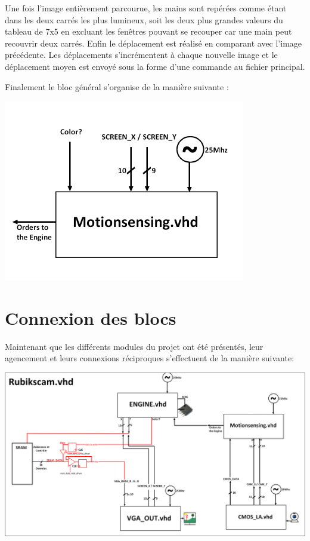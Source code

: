 \documentclass[10pt,a4paper]{report}
\begin{document}
Une fois l'image entièrement parcourue, les mains sont repérées comme étant dans les deux carrés les plus lumineux, soit les deux plus grandes valeurs du tableau de 7x5 en excluant les fenêtres pouvant se recouper car une main peut recouvrir deux carrés. Enfin le déplacement est réalisé en comparant avec l'image précédente. Les déplacements s'incrémentent à chaque nouvelle image et le déplacement moyen est envoyé sous la forme d'une commande au fichier principal.

Finalement le bloc général s'organise de la manière suivante :

\begin{center}
\includegraphics[width=300pt]{gfx/motionsensing.png}
\end{center}

\chapter{Connexion des blocs}

Maintenant que les différents modules du projet ont été présentés, leur agencement et leurs connexions réciproques s'effectuent de la manière suivante:

\begin{landscape}

\begin{center}
\includegraphics[width=590pt]{gfx/whole.png}
\end{center}
\end{landscape}
\end{document}
